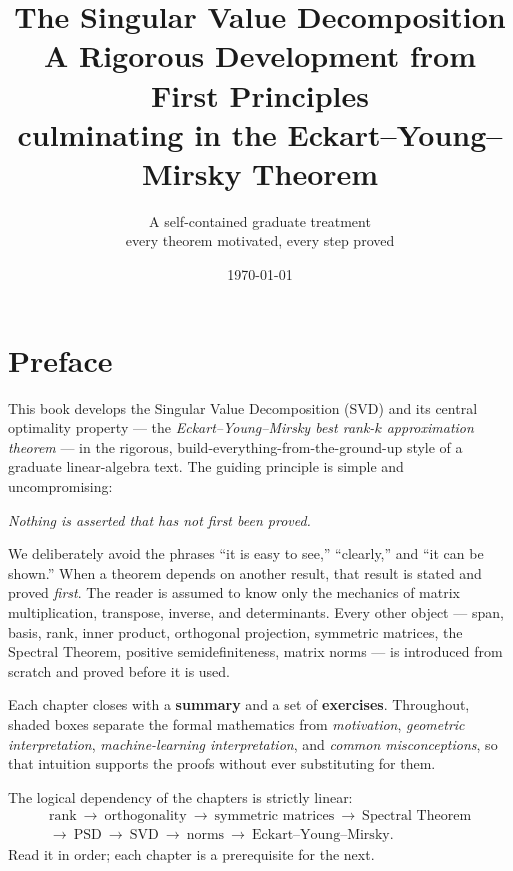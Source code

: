 \documentclass[11pt,oneside]{book}
\title{\vspace{-2cm}
  {\color{navy}\Huge\bfseries The Singular Value Decomposition}\\[10pt]
  {\color{steel}\LARGE A Rigorous Development from First Principles}\\[8pt]
  {\color{steel}\large culminating in the Eckart--Young--Mirsky Theorem}}
\author{\Large A self-contained graduate treatment\\[4pt]
  \normalsize every theorem motivated, every step proved}
\date{\today}
\theoremstyle{plain}
\theoremstyle{definition}
\theoremstyle{remark}
\begin{document}
\frontmatter
\maketitle

\chapter*{Preface}

This book develops the Singular Value Decomposition (SVD) and its central optimality
property --- the \emph{Eckart--Young--Mirsky best rank-$k$ approximation theorem} ---
in the rigorous, build-everything-from-the-ground-up style of a graduate linear-algebra
text. The guiding principle is simple and uncompromising:

\begin{center}
\emph{Nothing is asserted that has not first been proved.}
\end{center}

We deliberately avoid the phrases ``it is easy to see,'' ``clearly,'' and ``it can be
shown.'' When a theorem depends on another result, that result is stated and proved
\emph{first}. The reader is assumed to know only the mechanics of matrix
multiplication, transpose, inverse, and determinants. Every other object --- span,
basis, rank, inner product, orthogonal projection, symmetric matrices, the Spectral
Theorem, positive semidefiniteness, matrix norms --- is introduced from scratch and
proved before it is used.

Each chapter closes with a \textbf{summary} and a set of \textbf{exercises}. Throughout,
shaded boxes separate the formal mathematics from \emph{motivation}, \emph{geometric
interpretation}, \emph{machine-learning interpretation}, and \emph{common
misconceptions}, so that intuition supports the proofs without ever substituting for
them.

The logical dependency of the chapters is strictly linear:
\begin{gather*}
\text{rank}\ \to\ \text{orthogonality}\ \to\ \text{symmetric matrices}\ \to\
\text{Spectral Theorem}\\[2pt]
\to\ \text{PSD}\ \to\ \text{SVD}\ \to\ \text{norms}\ \to\
\text{Eckart--Young--Mirsky}.
\end{gather*}
Read it in order; each chapter is a prerequisite for the next.

\tableofcontents

\mainmatter
\end{document}

